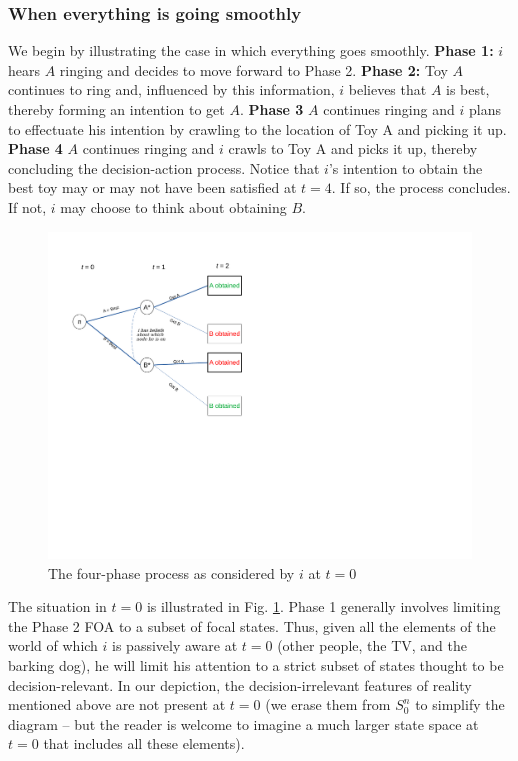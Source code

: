 \documentclass[
11pt,
titlepage,
reqno,
]{article}%
\theoremstyle{definition}
\begin{document}
\subsubsection{When everything is going smoothly}
We  begin by illustrating the case in which everything goes smoothly. \textbf{Phase 1:} $i$ hears $A$ ringing and decides to move forward to Phase 2. \textbf{Phase 2:} Toy $A$ continues to ring and, influenced by this information, $i$  believes that $A$ is best, thereby forming an intention to get $A$. \textbf{Phase 3} $A$ continues ringing and  $i$  plans to effectuate his intention by crawling to the location of Toy A and picking it up. \textbf{Phase 4} $A$ continues ringing and $i$ crawls to Toy A and picks it up, thereby concluding the decision-action process. Notice that $i$'s intention to obtain the best toy may or may not have been satisfied at $t=4$. If so, the process concludes. If not, $i$ may choose to think about obtaining $B$.

\begin{figure}[h!]
	\centering
	\includegraphics*[page=4,trim = 0 0in 0in 0in,scale=.60]{Awareness_Diagrams_All}
	\caption{The four-phase process as considered by $i$ at $t=0$\label{Diag: p-04}}%
\end{figure}

The situation in $t=0$ is illustrated in Fig. \ref{Diag: p-04}. Phase 1 generally involves limiting the Phase 2 FOA to a subset of focal states. Thus, given all the elements of the world of which $i$ is passively aware at $t=0$ (other people, the TV, and the barking dog), he will limit his attention to a strict subset of states thought to be  decision-relevant. In our depiction, the decision-irrelevant features of reality mentioned above are not present at $t=0$ (we erase them from $S^n_0$ to simplify the diagram -- but the reader is welcome to imagine a much larger state space at $t=0$ that includes all these elements).
\end{document}
